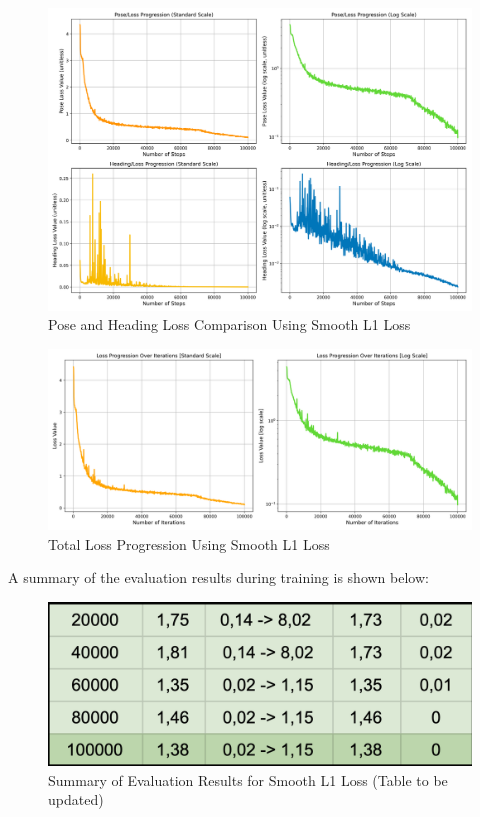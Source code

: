\begin{figure}[H]
    \centering
    \includegraphics[width=0.75\linewidth]{LateX//figs/l1s_pose_heading_loss_comparison.png}
    \caption{Pose and Heading Loss Comparison Using Smooth L1 Loss}
    \label{fig:smooth-l1-pose-heading-loss}
\end{figure}

\begin{figure}[H]
    \centering
    \includegraphics[width=0.75\linewidth]{LateX//figs/loss_total_l1s_progression_comparison.png}
    \caption{Total Loss Progression Using Smooth L1 Loss}
    \label{fig:smooth-l1-total-loss}
\end{figure}



A summary of the evaluation results during training is shown below:

\begin{figure}[H]
    \centering
    \includegraphics[width=0.5\linewidth]{Screenshot 2024-11-14 at 11.50.25.png}
    \caption{Summary of Evaluation Results for Smooth L1 Loss (Table to be updated)}
    \label{fig:smooth-l1-evaluation}
\end{figure}

